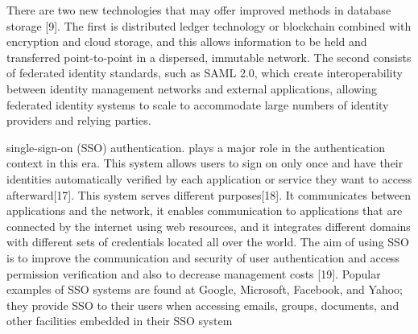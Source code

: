 There are two new technologies that may offer improved methods in database storage [9]. The first is distributed ledger technology or blockchain combined with encryption and cloud storage, and this allows information to be held and transferred point-to-point in a dispersed, immutable network. The second consists of federated identity standards, such as SAML 2.0, which create interoperability between identity management networks and external applications, allowing federated identity systems to scale to accommodate large numbers of identity providers and relying parties.

single-sign-on (SSO) authentication. plays a major role in the authentication context in this era. This system allows users to sign on only once and have their identities automatically verified by each application or service they want to access afterward[17]. This system serves different purposes[18]. It communicates between applications and the network, it enables communication to applications that are connected by the internet using web resources, and it integrates different domains with different sets of credentials located all over the world. The aim of using SSO is to improve the communication and security of user authentication and access permission verification and also to decrease management costs [19]. Popular examples of SSO systems are found at Google, Microsoft, Facebook, and Yahoo; they provide SSO to their users when accessing emails, groups, documents, and other facilities embedded in their SSO system



  

  